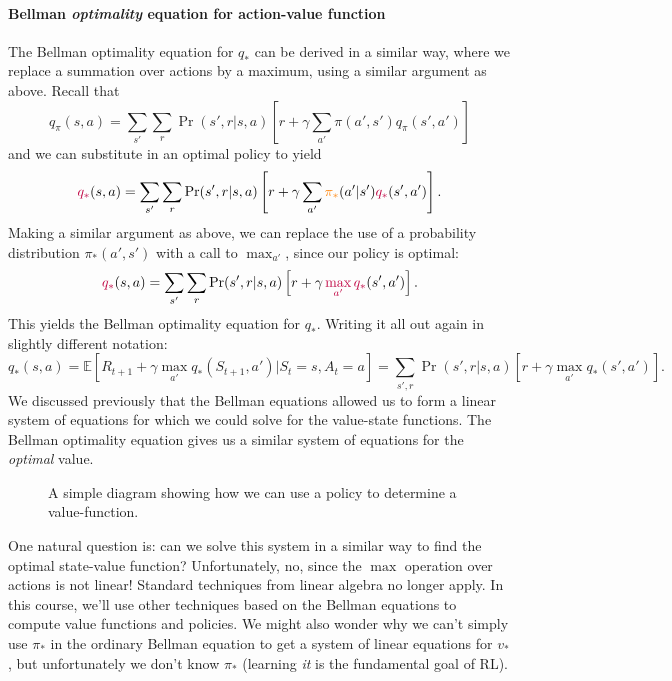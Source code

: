 \documentclass[12pt]{article}
\begin{document}
\paragraph{Bellman \emph{optimality} equation for action-value function}
The Bellman optimality equation for $q_*$ can be derived in a similar way, where we replace a summation over actions by a maximum, using a similar argument as above. Recall that
\[
q_\pi(s,a) = \sum_{s'} \sum_r\Pr(s', r|s,a) \left[ r + \gamma \sum_{a'} \pi(a',s')q_\pi(s',a')\right]
\]
and we can substitute in an optimal policy to yield
\[
  \color{purple} q_* \color{black} (s,a) = \sum_{s'} \sum_r \Pr(s',r|s,a) \left[ r + \gamma \sum_{a'} \color{orange} \pi_* \color{black} (a'|s') \color{purple} q_* \color{black}(s',a')\right].
\]
Making a similar argument as above, we can replace the use of a probability distribution $\pi_*(a',s')$ with a call to $\max_{a'}$, since our policy is optimal:
\[
  \color{purple} q_* \color{black} (s,a) = \sum_{s'} \sum_r \Pr(s',r|s,a) \left[ r + \gamma \color{purple} \max_{a'} \color{purple} q_* \color{black}(s',a')\right].  
\]
This yields the Bellman optimality equation for $q_*$. Writing it all out again in slightly different notation:
\[
  q_*(s,a) = \mathbb E \left[R_{t+1} + \gamma \max_{a'} q_*(S_{t+1}, a') | S_t = s, A_t = a \right] = \sum_{s',r} \Pr(s', r|s,a) \left[r + \gamma \max_{a'} q_*(s', a') \right].
\]
We discussed previously that the Bellman equations allowed us to form a linear system of equations for which we could solve for the value-state functions. The Bellman optimality equation gives us a similar system of equations for the \emph{optimal} value.
\begin{figure}[h]
  \centering
  \caption{\footnotesize A simple diagram showing how we can use a policy to determine a value-function.}
\end{figure}
One natural question is: can we solve this system in a similar way to find the optimal state-value function? Unfortunately, no, since the $\max$ operation over actions is not linear! Standard techniques from linear algebra no longer apply. In this course, we'll use other techniques based on the Bellman equations to compute value functions and policies. We might also wonder why we can't simply use $\pi_*$ in the ordinary Bellman equation to get a system of linear equations for $v_*$, but unfortunately we don't know $\pi_*$ (learning \emph{it} is the fundamental goal of RL).
\end{document}

